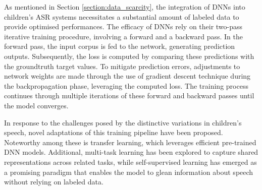 As mentioned in Section \ref{section:data_scarcity}, the integration of DNNs into children's ASR systems necessitates a substantial amount of labeled data to  provide optimised performances. The efficacy of DNNs rely on their two-pass iterative training procedure, involving a forward and a backward pass. In the forward pass, the input corpus is fed to the network, generating prediction outputs. Subsequently, the loss is computed by comparing these predictions with the groundtruth target values. To mitigate prediction errors, adjustments to network weights are made through the use of gradient descent technique during the backpropagation phase, leveraging the computed loss. The training process continues through multiple iterations of these forward and backward passes until the model converges.

In response to the challenges posed by the distinctive variations in children's speech, novel adaptations of this training pipeline have been proposed. Noteworthy among these is transfer learning, which leverages efficient pre-trained DNN models. Additional, multi-task learning has been explored to capture shared representations across related tasks, while self-supervised learning has emerged as a promising paradigm that enables the model to glean information about speech without relying on labeled data.





